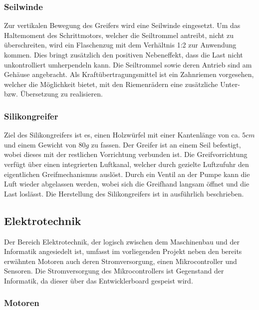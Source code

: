 \subsubsection{Seilwinde}

Zur vertikalen Bewegung des Greifers wird eine Seilwinde eingesetzt. Um das Haltemoment des Schrittmotors, welcher die Seiltrommel antreibt, nicht zu überschreiten, wird ein Flaschenzug mit dem Verhältnis 1:2 zur Anwendung kommen. Dies bringt zusätzlich den positiven Nebeneffekt, dass die Last nicht unkontrolliert umherpendeln kann. Die Seiltrommel sowie deren Antrieb sind am Gehäuse angebracht. Als Kraftübertragungsmittel ist ein Zahnriemen vorgesehen, welcher die Möglichkeit bietet, mit den Riemenrädern eine zusätzliche Unter- bzw. Übersetzung zu realisieren.

\subsubsection{Silikongreifer}

Ziel des Silikongreifers ist es, einen Holzwürfel mit einer Kantenlänge von ca. $5cm$ und einem Gewicht von $80g$ zu fassen. Der Greifer ist an einem Seil befestigt, wobei dieses mit der restlichen Vorrichtung verbunden ist. Die Greifvorrichtung verfügt über einen integrierten Luftkanal, welcher durch gezielte Luftzufuhr den eigentlichen Greifmechanismus auslöst. Durch ein Ventil an der Pumpe kann die Luft wieder abgelassen werden, wobei sich die Greifhand langsam öffnet und die Last loslässt. Die Herstellung des Silikongreifers ist in  ausführlich beschrieben.

\subsection{Elektrotechnik}
\label{sec:komponenten-elektrotechnik}

Der Bereich Elektrotechnik, der logisch zwischen dem Maschinenbau und der Informatik angesiedelt ist, umfasst im vorliegenden Projekt neben den bereits erwähnten Motoren auch deren Stromversorgung, einen Mikrocontroller und Sensoren. Die Stromversorgung des Mikrocontrollers ist Gegenstand der Informatik, da dieser über das Entwicklerboard gespeist wird.

\subsubsection{Motoren}

